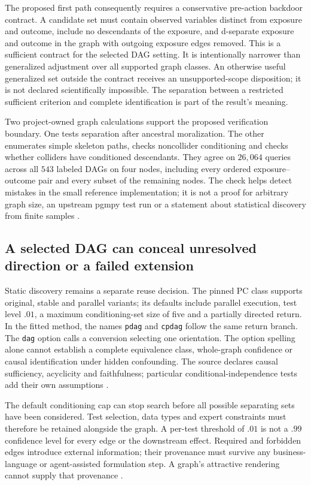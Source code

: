 The proposed first path consequently requires a conservative pre-action
backdoor contract. A candidate set must contain observed variables distinct
from exposure and outcome, include no descendants of the exposure, and
d-separate exposure and outcome in the graph with outgoing exposure edges
removed. This is a sufficient contract for the selected DAG setting. It
is intentionally narrower than generalized adjustment over all supported
graph classes. An otherwise useful generalized set outside the contract
receives an unsupported-scope disposition; it is not declared scientifically
impossible. The separation between a restricted sufficient criterion and
complete identification is part of the result's meaning.

Two project-owned graph calculations support the proposed verification
boundary. One tests separation after ancestral moralization. The other
enumerates simple skeleton paths, checks noncollider conditioning and checks
whether colliders have conditioned descendants. They agree on $26{,}064$
queries across all $543$ labeled DAGs on four nodes, including every ordered
exposure--outcome pair and every subset of the remaining nodes. The check
helps detect mistakes in the small reference implementation; it is not a
proof for arbitrary graph size, an upstream pgmpy test run or a statement
about statistical discovery from finite samples
\cite{exec13_pgmpy_reuse_oracle}.

\subsection{A selected DAG can conceal unresolved direction or a failed extension}

Static discovery remains a separate reuse decision. The pinned PC class
supports original, stable and parallel variants; its defaults include
parallel execution, test level $.01$, a maximum conditioning-set size of
five and a partially directed return. In the fitted method, the names
\texttt{pdag} and \texttt{cpdag} follow the same return branch.
The \texttt{dag} option calls a conversion selecting one orientation.
The option spelling alone cannot establish a complete equivalence class,
whole-graph confidence or causal identification under hidden confounding.
The source declares causal sufficiency, acyclicity and faithfulness;
particular conditional-independence tests add their own assumptions
\cite{exec13_pgmpy_reuse_primary}.

The default conditioning cap can stop search before all possible separating
sets have been considered. Test selection, data types and expert constraints
must therefore be retained alongside the graph. A per-test threshold of
$.01$ is not a $.99$ confidence level for every edge or the downstream
effect. Required and forbidden edges introduce external information;
their provenance must survive any business-language or agent-assisted
formulation step. A graph's attractive rendering cannot supply that
provenance \cite{exec13_pgmpy_reuse_primary}.

